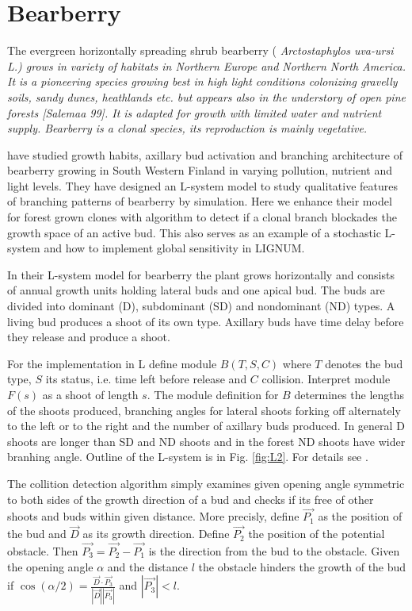 \section{Bearberry}\label{sec:bearberry}

The   evergreen   horizontally    spreading   shrub   bearberry   (\it
Arctostaphylos  uva-ursi \rm  L.)  grows  in variety  of  habitats in
Northern Europe and Northern North America.  It is a pioneering species
growing best in high light conditions colonizing gravelly soils, sandy
dunes, heathlands  etc.  but  appears also in  the understory  of open
pine  forests [Salemaa  99].  It  is adapted  for growth  with limited
water  and  nutrient  supply.  Bearberry  is  a  clonal  species,  its
reproduction is mainly vegetative.

\citet{salemaa:02} have studied growth habits, axillary bud activation
and  branching  architecture of  bearberry  growing  in South  Western
Finland in  varying pollution, nutrient  and light levels.   They have
designed an L-system model  to study qualitative features of branching
patterns of bearberry by simulation.   Here we enhance their model for
forest  grown clones  with  algorithm  to detect  if  a clonal  branch
blockades the  growth space of an  active bud. This also  serves as an
example of  a stochastic L-system  \citep{pp:96} and how  to implement
global sensitivity \citep{kurth:94} in LIGNUM.

In  their L-system  model for  bearberry \citep{salemaa:02}  the plant
grows horizontally and consists of annual growth units holding lateral
buds  and one apical  bud.  The  buds are  divided into  dominant (D),
subdominant (SD) and nondominant (ND)  types.  A living bud produces a
shoot  of its  own type.  Axillary buds  have time  delay  before they
release and produce a shoot.

For the implementation in L define module $B(T,S,C)$ where $T$ denotes
the bud type,  $S$ its status, i.e.  time left  before release and $C$
collision.  Interpret  module $F(s)$  as a shoot  of length  $s$.  The
module  definition  for  $B$  determines  the lengths  of  the  shoots
produced, branching angles for  lateral shoots forking off alternately
to the left or to the  right and the number of axillary buds produced.
In general D shoots are longer than SD and ND shoots and in the forest
ND shoots  have wider branhing angle.   Outline of the  L-system is in
Fig. \ref{fig:L2}.  For details see \citet{salemaa:02}.

The collition detection algorithm  simply examines given opening angle
symmetric to both sides of the growth direction of a bud and checks if
its  free  of other  shoots  and  buds  within given  distance.   More
precisly, define $\vec {P_1}$ as the  position of the bud and $\vec D$
as  its growth  direction. Define  $\vec  {P_2}$ the  position of  the
potential obstacle. Then $\vec {P_3} = \vec {P_2} - \vec {P_1}$ is the
direction  from the  bud  to  the obstacle.  Given  the opening  angle
$\alpha$ and the  distance $l$ the obstacle hinders  the growth of the
bud  if $\cos(\alpha/2) =  \frac{{\vec D}  \cdot {\vec  {P_3}}} {|\vec
  D||\vec {P_3}|}$ and $|\vec {P_3}| < l$.

